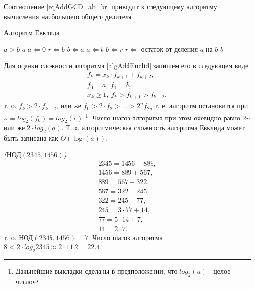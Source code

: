 Соотношение \eqref{eqAddGCD_ab_br} приводит к следующему алгоритму
вычисления наибольшего общего делителя
\begin{algorithm}
\caption{Алгоритм Евклида}
\begin{algorithmic}
    \STATE $a > b$
        \RETURN $a$
    \ENDIF
    \STATE $a \Leftarrow 0$
    \STATE $r \Leftarrow b$
    \STATE $b \Leftarrow a$
    \REPEAT
        \STATE $a \Leftarrow b$
        \STATE $b \Leftarrow r$
        \STATE $r \Leftarrow $ остаток от деления $a$ на $b$
    \RETURN $b$
\end{algorithmic}
\label{algAddEuclid}
\end{algorithm}

Для оценки сложности алгоритма \ref{algAddEuclid} запишем его в
следующем виде 
\begin{eqnarray}
f_k = x_k \cdot f_{k + 1} + f_{k + 2},
\nonumber \\
f_0 = a, \: f_1 = b,
\nonumber \\
x_k \ge 1, \: f_k > f_{k+1} > f_{k + 2},
\nonumber
\end{eqnarray}
т. о. $f_k > 2 \cdot f_{k + 2}$, или же 
$f_0 > 2 \cdot f_2 > \dots > 2^nf_{2n}$ т. е. алгоритм остановится при
$n = log_2\left(f_0\right) = log_2\left(a\right)$
\footnote{Дальнейшие выкладки сделаны в предположении, что
  $log_2\left(a\right)$ - целое число}. Число шагов
алгоритма при этом очевидно равно $2n$ или же 
$2 \cdot log_2\left(a\right)$. Т. о. алгоритмическая сложность
алгоритма Евклида может быть записана как 
$O\left(\log \left(a\right)\right)$.


\begin{example}
\emph{($\mbox{НОД}\left(2345,1456\right)$)}
\begin{eqnarray}
2345 = 1456 + 889,
\nonumber \\
1456 = 889 + 567,
\nonumber \\
889 = 567 + 322,
\nonumber \\
567 = 322 + 245,
\nonumber \\
322 = 245 + 77,
\nonumber \\
245 = 3 \cdot 77 + 14,
\nonumber \\
77 = 5 \cdot 14 + 7,
\nonumber \\
14 = 2 \cdot 7.
\nonumber
\end{eqnarray}
т. о. $\mbox{НОД}\left(2345,1456\right) = 7$. 
Число шагов алгоритма  $8 < 2 \cdot log_2{2345} \approx 2 \cdot 11.2 = 22.4$.
\nonumber
\end{example}

